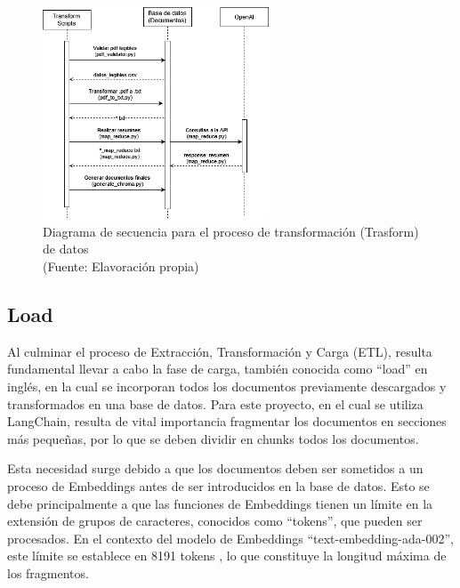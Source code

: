 \begin{figure}[ht!]
    \centering
    \includegraphics[width=0.6\textwidth]{figures/transfrom_diagram.png}
    \caption[Diagrama de secuencia para el proceso de transformación (Trasform) de datos]{Diagrama de secuencia para el proceso de transformación (Trasform) de datos\\
    {\scriptsize (Fuente: Elavoración propia)}}
    \label{fig:chatbot1}
\end{figure}

\subsection{Load}

\par Al culminar el proceso de Extracción, Transformación y Carga (ETL), resulta fundamental llevar a cabo la fase de carga, 
también conocida como ``load'' en inglés, en la cual se incorporan todos los documentos previamente descargados y transformados 
en una base de datos. Para este proyecto, en el cual se utiliza LangChain, resulta de vital importancia fragmentar los documentos 
en secciones más pequeñas, por lo que se deben dividir en chunks todos los documentos.

\par Esta necesidad surge debido a que los documentos deben ser sometidos a un proceso de Embeddings antes de ser 
introducidos en la base de datos. Esto se debe principalmente a que las funciones de Embeddings tienen un límite en la extensión 
de grupos de caracteres, conocidos como ``tokens'', que pueden ser procesados. En el contexto del modelo de Embeddings 
``text-embedding-ada-002'', este límite se establece en 8191 tokens \cite{openai1}, lo que constituye la longitud máxima de los fragmentos.

